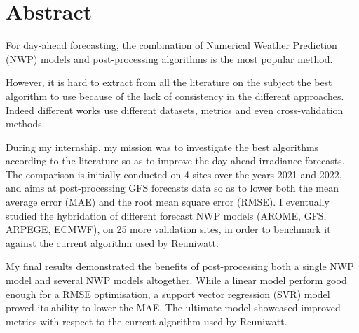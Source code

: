 \section*{Abstract}

For day-ahead forecasting, the combination of Numerical Weather Prediction (NWP) models and post-processing algorithms is the most popular method.

However, it is hard to extract from all the literature on the subject the best algorithm to use because of the lack of consistency in the different approaches.
Indeed different works use different datasets, metrics and even cross-validation methods. 

During my internship, my mission was to investigate the best algorithms according to the literature so as to improve the day-ahead irradiance forecasts. 
The comparison is initially conducted on 4 sites over the years 2021 and 2022, and aims at post-processing GFS forecasts data so as to lower both the mean average error (MAE) and the root mean square error (RMSE).
I eventually studied the hybridation of different forecast NWP models (AROME, GFS, ARPEGE, ECMWF), on 25 more validation sites, in order to benchmark it against the current algorithm used by Reuniwatt.

My final results demonstrated the benefits of post-processing both a single NWP model and several NWP models altogether.
While a linear model perform good enough for a RMSE optimisation, a support vector regression (SVR) model proved its ability to lower the MAE.
The ultimate model showcased improved metrics with respect to the current algorithm used by Reuniwatt.

